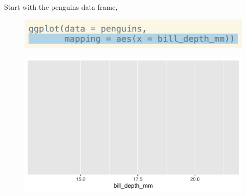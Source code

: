 \documentclass[11pt]{beamer}
\begin{document}
		\begin{frame}
		

		Start with the penguins data frame, 
		
		\begin{minipage}[t]{0.5\linewidth}
			\begin{figure}
				\centering
				\includegraphics[width=1\linewidth]{Images/S2/code/s7}
				
			\end{figure}
		\end{minipage}%
		\begin{minipage}[t]{0.5\linewidth}
			
			\begin{figure}
				\centering
				\includegraphics[width=1\linewidth]{Images/S2/penguins-1-1}
				
			\end{figure}
			
			
		\end{minipage}
		
	\end{frame}
	
\end{document}
